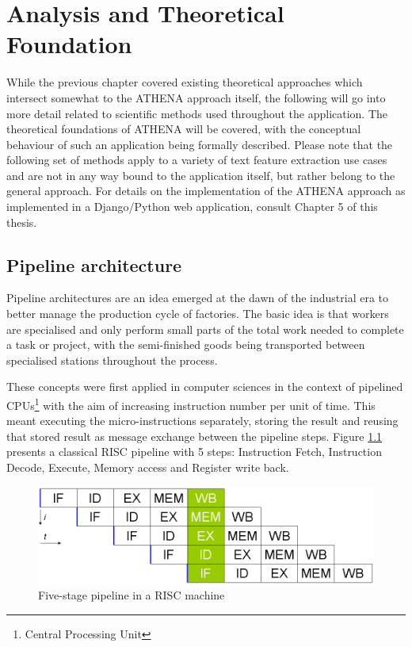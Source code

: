 \chapter{Analysis and Theoretical Foundation}
\label{ch:analysis}
While the previous chapter covered existing theoretical approaches which intersect somewhat to the ATHENA approach itself, the following will go into more detail related to scientific methods used throughout the application. The theoretical foundations of ATHENA will be covered, with the conceptual behaviour of such an application being formally described. Please note that the following set of methods apply to a variety of text feature extraction use cases and are not in any way bound to the application itself, but rather belong to the general approach. For details on the implementation of the ATHENA approach as implemented in a Django/Python web application, consult Chapter 5 of this thesis.

\section{Pipeline architecture}
Pipeline architectures are an idea emerged at the dawn of the industrial era to better manage the production cycle of factories. The basic idea is that workers are specialised and only perform small parts of the total work needed to complete a task or project, with the semi-finished goods being transported between specialised stations throughout the process.

These concepts were first applied in computer sciences in the context of pipelined CPUs\footnote{Central Processing Unit} with the aim of increasing instruction number per unit of time. This meant executing the micro-instructions separately, storing the result and reusing that stored result as message exchange between the pipeline steps. Figure \ref{fig:cpupipe} presents a classical RISC pipeline with 5 steps: Instruction Fetch, Instruction Decode, Execute, Memory access and Register write back.

\begin{figure}
    \centering
\includegraphics[width=0.8\columnwidth]{img/cpupipe.png}
    \caption{Five-stage pipeline in a RISC machine}
    \label{fig:cpupipe}
\end{figure}

